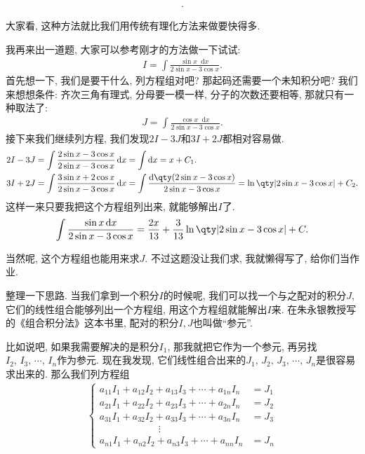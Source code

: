 \documentclass{ctexbook}
\newcommand*{\dif}{\mathop{}\!\mathrm{d}}
\begin{document}
{\begin{align*}
.\end{align*}\par
大家看, 这种方法就比我们用传统有理化方法来做要快得多. \par
我再来出一道题, 大家可以参考刚才的方法做一下试试: 
\begin{align*}
I=\int\frac{\sin{x}\dif{x}}{2\sin{x}-3\cos{x}}
.\end{align*}
首先想一下, 我们是要干什么, 列方程组对吧? 那起码还需要一个未知积分吧? 我们来想想条件: 齐次三角有理式, 分母要一模一样, 分子的次数还要相等, 那就只有一种取法了: 
\begin{align*}
J=\int\frac{\cos{x}\dif{x}}{2\sin{x}-3\cos{x}}
.\end{align*}
接下来我们继续列方程, 我们发现$2I-3J$和$3I+2J$都相对容易做. 
\begin{align*}
{}&2I-3J=\int\frac{2\sin{x}-3\cos{x}}{2\sin{x}-3\cos{x}}\dif{x}=\int\dif{x}=x+C_{1}.\\
{}&3I+2J=\int\frac{3\sin{x}+2\cos{x}}{2\sin{x}-3\cos{x}}\dif{x}=\int\frac{\dif{\qty(2\sin{x}-3\cos{x})}}{2\sin{x}-3\cos{x}}=\ln\qty|2\sin{x}-3\cos{x}|+C_{2}
.\end{align*}
这样一来只要我把这个方程组列出来, 就能够解出$I$了. 
\begin{align*}
\int\frac{\sin{x}\dif{x}}{2\sin{x}-3\cos{x}}=\frac{2x}{13}+\frac{3}{13}\ln\qty|2\sin{x}-3\cos{x}|+C
.\end{align*}\par
当然呢, 这个方程组也能用来求$J$. 不过这题没让我们求, 我就懒得写了, 给你们当作业. \par
整理一下思路. 当我们拿到一个积分$I$的时候呢, 我们可以找一个与之配对的积分$J$, 它们的线性组合能够列出一个方程组, 用这个方程组就能解出$I$来. 在朱永银教授写的《组合积分法》这本书里, 配对的积分$I,J$也叫做“参元”. \par
比如说吧, 如果我需要解决的是积分$I_{1}$, 那我就把它作为一个参元, 再另找$I_{2},\,I_{3},\,\cdots,\,I_{n}$作为参元. 现在我发现, 它们线性组合出来的$J_{1},\,J_{2},\,J_{3},\,\cdots,\,J_{n}$是很容易求出来的. 那么我们列方程组
\begin{align*}
\begin{cases}
a_{11}I_{1}+a_{12}I_{2}+a_{13}I_{3}+\cdots+a_{1n}I_{n}&=J_{1}\\
a_{21}I_{1}+a_{22}I_{2}+a_{23}I_{3}+\cdots+a_{2n}I_{n}&=J_{2}\\
a_{31}I_{1}+a_{32}I_{2}+a_{33}I_{3}+\cdots+a_{3n}I_{n}&=J_{3}\\
\qquad\qquad\qquad\vdots\\
a_{n1}I_{1}+a_{n2}I_{2}+a_{n3}I_{3}+\cdots+a_{nn}I_{n}&=J_{n}

\end{cases}
\end{align*}}
\end{document}
